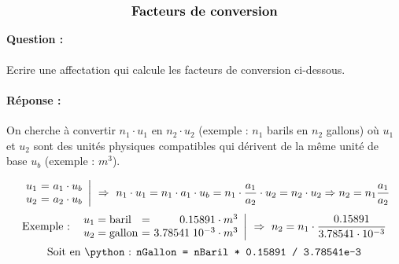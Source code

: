 \documentclass[11pt,a4paper]{article}
\begin{document}
$$\mbox{\textbf{\large Facteurs de conversion}}$$
\paragraph{Question :}
Ecrire une affectation qui calcule les facteurs de conversion ci-dessous.

\paragraph{Réponse :} On cherche à convertir $n_1\cdot u_1$ en $n_2\cdot u_2$ 
(exemple : $n_1$ barils en $n_2$ gallons) où $u_1$ et $u_2$ sont des unités physiques compatibles qui dérivent de la même unité de base $u_b$ (exemple : $m^3$).

$$\left.\begin{array}{l@{\ =\ }r}
u_1 & a_1\cdot u_b \\
u_2 & a_2\cdot u_b
\end{array}\right|
\ \Rightarrow\ n_1\cdot u_1 = n_1\cdot a_1\cdot u_b = n_1\cdot \frac{a_1}{a_2}\cdot u_2 = n_2\cdot u_2 \Rightarrow n_2 = n_1 \frac{a_1}{a_2}$$
$$\mbox{Exemple : }\left.\begin{array}{l@{\ =\ }r}
u_1 = \mbox{baril}  & 0.15891\cdot m^3\\
u_2 = \mbox{gallon} & 3.78541\; 10^{-3}\cdot m^3
\end{array}\right|
\ \Rightarrow\ n_2 = n_1\cdot \frac{0.15891}{3.78541\cdot 10^{-3}}$$
$$\mbox{Soit en \python : \texttt{nGallon = nBaril * 0.15891 / 3.78541e-3}}$$
\vspace*{3mm}
\end{document}
